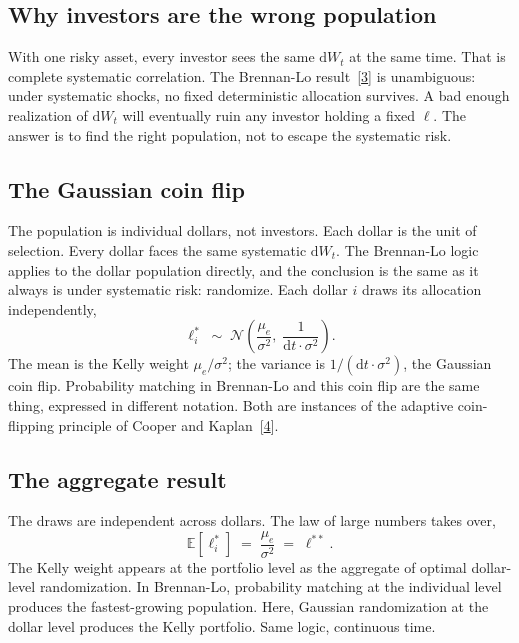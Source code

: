 \documentclass[11pt]{article}
\newcommand{\lopt}{\ell^{*}}
\newcommand{\lkelly}{\ell^{**}}
\newcommand{\mue}{\mu_{e}}
\newcommand{\E}{\mathbb{E}}
\newcommand{\dd}{\mathrm{d}}
\begin{document}
\subsection{Why investors are the wrong population}

With one risky asset, every investor sees the same $\dd W_{t}$ at
the same time. That is complete systematic correlation. The
Brennan-Lo result~[\hyperlink{ref:3}{3}] is unambiguous: under systematic shocks, no
fixed deterministic allocation survives. A bad enough realization of
$\dd W_{t}$ will eventually ruin any investor holding a fixed $\ell$.
The answer is to find the right population, not to escape the
systematic risk.

\subsection{The Gaussian coin flip}

The population is individual dollars, not investors. Each dollar is
the unit of selection. Every dollar faces the same systematic
$\dd W_{t}$. The Brennan-Lo logic applies to the dollar population
directly, and the conclusion is the same as it always is under
systematic risk: randomize. Each dollar $i$ draws its allocation
independently,
\begin{equation}
  \lopt_{i} \;\sim\; \mathcal{N}\!\left(
    \frac{\mue}{\sigma^{2}},\;
    \frac{1}{\dd t\cdot\sigma^{2}}
  \right).
  \label{eq:gaussiancoin}
\end{equation}
The mean is the Kelly weight $\mue/\sigma^{2}$;
the variance is $1/(\dd t\cdot\sigma^{2})$, the Gaussian coin flip.
Probability matching in Brennan-Lo and this coin flip are the same
thing, expressed in different notation. Both are instances of the
adaptive coin-flipping principle of Cooper and Kaplan~[\hyperlink{ref:4}{4}].

\subsection{The aggregate result}

The draws are independent across dollars. The law of large numbers
takes over,
\begin{equation}
  \E[\lopt_{i}] \;=\; \frac{\mue}{\sigma^{2}} \;=\; \lkelly.
  \label{eq:aggregate}
\end{equation}
The Kelly weight appears at the portfolio level as the aggregate of
optimal dollar-level randomization. In Brennan-Lo, probability
matching at the individual level produces the fastest-growing
population. Here, Gaussian randomization at the dollar level produces
the Kelly portfolio. Same logic, continuous time.
\end{document}
